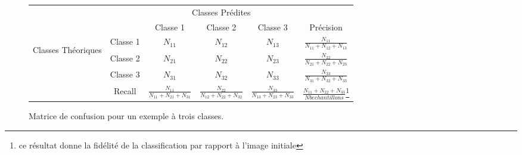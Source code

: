 \begin{figure*}
\caption{Matrice de confusion pour un exemple à trois classes.}
\label{ConfMat}
\begin{center}
\renewcommand{\arraystretch}{3}
\begin{tabular}{|c|c|c|c|c|c|}
\hline
 \multicolumn{2}{|c|}{\multirow{2}{*}{}} & \multicolumn{3}{|c}{Classes Prédites} &  \\
 \cline{3-6}
  \multicolumn{2}{|c|}{} & Classe 1 & Classe 2 & Classe 3 & Précision\\
  \hline
 \multirow{3}{*}{\begin{turn}{90} Classes Théoriques\end{turn}} & Classe 1 & $N_{11}$ & $N_{12}$ & $N_{13}$ & $\frac{N_{11}}{N_{11} + N_{12} + N_{13} }$\\
 \cline{2-6}
  & Classe 2 & $N_{21}$ & $N_{22}$ & $N_{23}$ & $\frac{N_{22}}{N_{21} + N_{22} + N_{23} }$\\
  \cline{2-6}
  & Classe 3 & $N_{31}$ & $N_{32}$ & $N_{33}$ & $\frac{N_{33}}{N_{31} + N_{32} + N_{33} }$\\
  \cline{2-6}
  & Recall  & $\frac{N_{11}}{N_{11} + N_{21} + N_{31} }$ & $\frac{N_{22}}{N_{12} + N_{22} + N_{32} }$ & $\frac{N_{33}}{N_{13} + N_{23} + N_{33} }$ & $\frac{N_{11} + N_{22} + N_{33}}{Nb echantillons}$\footnote {ce résultat donne la fidélité de la classification par rapport à l'image initiale} \\
\hline
\end{tabular}
\end{center}
\end{figure*}
